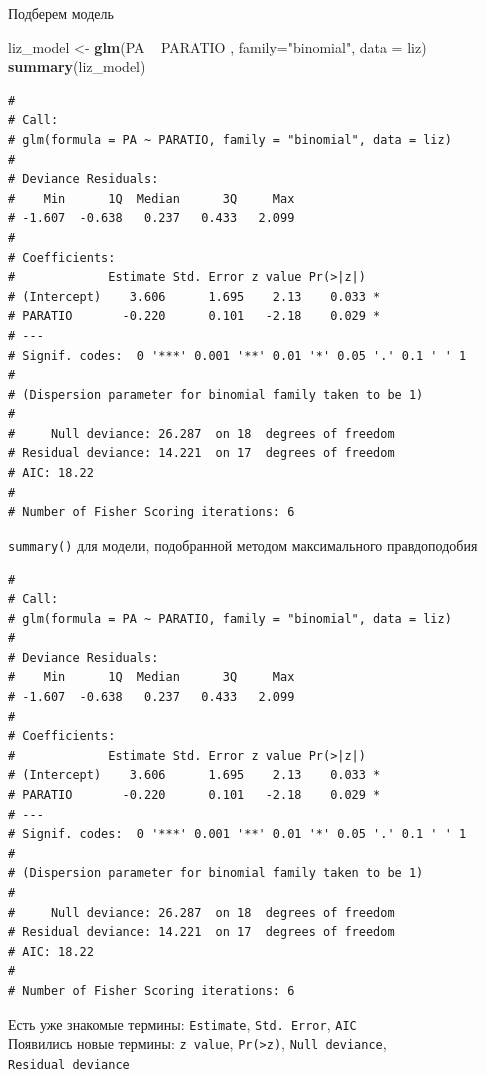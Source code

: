 \documentclass[ignorenonframetext,]{beamer}
\newenvironment{Shaded}{\begin{snugshade}}{\end{snugshade}}
\newcommand{\KeywordTok}[1]{\textcolor[rgb]{0.13,0.29,0.53}{\textbf{{#1}}}}
\newcommand{\DataTypeTok}[1]{\textcolor[rgb]{0.13,0.29,0.53}{{#1}}}
\newcommand{\StringTok}[1]{\textcolor[rgb]{0.31,0.60,0.02}{{#1}}}
\newcommand{\NormalTok}[1]{{#1}}
\begin{document}
\begin{frame}[fragile]{Подберем модель}

\begin{Shaded}
\begin{Highlighting}[]
\NormalTok{liz_model <-}\StringTok{ }\KeywordTok{glm}\NormalTok{(PA ~}\StringTok{ }\NormalTok{PARATIO , }\DataTypeTok{family=}\StringTok{"binomial"}\NormalTok{, }\DataTypeTok{data =} \NormalTok{liz)}
\KeywordTok{summary}\NormalTok{(liz_model)}
\end{Highlighting}
\end{Shaded}

\begin{verbatim}
# 
# Call:
# glm(formula = PA ~ PARATIO, family = "binomial", data = liz)
# 
# Deviance Residuals: 
#    Min      1Q  Median      3Q     Max  
# -1.607  -0.638   0.237   0.433   2.099  
# 
# Coefficients:
#             Estimate Std. Error z value Pr(>|z|)  
# (Intercept)    3.606      1.695    2.13    0.033 *
# PARATIO       -0.220      0.101   -2.18    0.029 *
# ---
# Signif. codes:  0 '***' 0.001 '**' 0.01 '*' 0.05 '.' 0.1 ' ' 1
# 
# (Dispersion parameter for binomial family taken to be 1)
# 
#     Null deviance: 26.287  on 18  degrees of freedom
# Residual deviance: 14.221  on 17  degrees of freedom
# AIC: 18.22
# 
# Number of Fisher Scoring iterations: 6
\end{verbatim}

\end{frame}

\begin{frame}[fragile]{\texttt{summary()} для модели, подобранной
методом максимального правдоподобия}

\begin{verbatim}
# 
# Call:
# glm(formula = PA ~ PARATIO, family = "binomial", data = liz)
# 
# Deviance Residuals: 
#    Min      1Q  Median      3Q     Max  
# -1.607  -0.638   0.237   0.433   2.099  
# 
# Coefficients:
#             Estimate Std. Error z value Pr(>|z|)  
# (Intercept)    3.606      1.695    2.13    0.033 *
# PARATIO       -0.220      0.101   -2.18    0.029 *
# ---
# Signif. codes:  0 '***' 0.001 '**' 0.01 '*' 0.05 '.' 0.1 ' ' 1
# 
# (Dispersion parameter for binomial family taken to be 1)
# 
#     Null deviance: 26.287  on 18  degrees of freedom
# Residual deviance: 14.221  on 17  degrees of freedom
# AIC: 18.22
# 
# Number of Fisher Scoring iterations: 6
\end{verbatim}

Есть уже знакомые термины: \texttt{Estimate}, \texttt{Std.\ Error},
\texttt{AIC}\\
Появились новые термины: \texttt{z\ value},
\texttt{Pr(\textgreater{}\textbar{}z\textbar{})},
\texttt{Null\ deviance}, \texttt{Residual\ deviance}

\end{frame}
\end{document}
